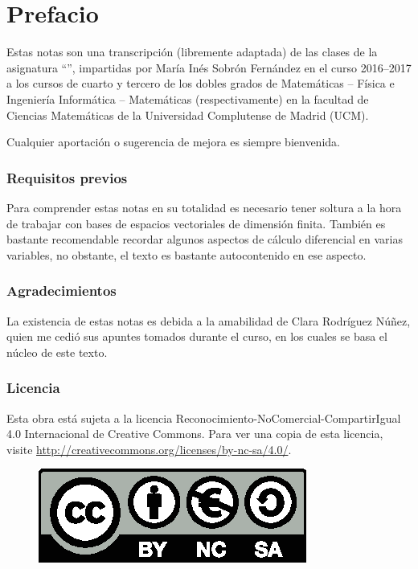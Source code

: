 \chapter*{Prefacio}
Estas notas son una transcripción (libremente adaptada) de las clases de la asignatura ``'', impartidas por María Inés Sobrón Fernández en el curso 2016--2017 a los cursos de cuarto y tercero de los dobles grados de  Matemáticas -- Física e Ingeniería Informática -- Matemáticas (respectivamente) en la facultad de Ciencias Matemáticas de la Universidad Complutense de Madrid (UCM).

Cualquier aportación o sugerencia de mejora es siempre bienvenida.
\subsection*{Requisitos previos}
Para comprender estas notas en su totalidad es necesario tener soltura a la hora de trabajar con bases de espacios vectoriales de dimensión finita. También es bastante recomendable recordar algunos aspectos de cálculo diferencial en varias variables, no obstante, el texto es bastante autocontenido en ese aspecto.
\subsection*{Agradecimientos}
La existencia de estas notas es debida a la amabilidad de Clara Rodríguez Núñez, quien me cedió sus apuntes tomados durante el curso, en los cuales se basa el núcleo de este texto.
\subsection*{Licencia}
Esta obra está sujeta a la licencia Reconocimiento-NoComercial-CompartirIgual 4.0 Internacional de Creative Commons. Para ver una copia de esta licencia, visite \url{http://creativecommons.org/licenses/by-nc-sa/4.0/}.
\begin{figure}[h]
	\centering
	\includegraphics[scale=1]{img/licencia}
\end{figure}